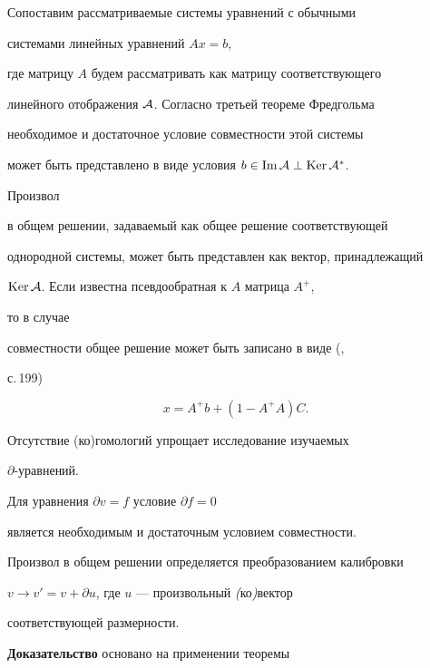  


Сопоставим рассматриваемые системы уравнений с обычными 


системами линейных уравнений $Ax=b$, 


где матрицу $A$ будем рассматривать как матрицу соответствующего 


линейного отображения $\cal A$. Согласно третьей теореме Фредгольма


необходимое и достаточное условие совместности этой системы 


может быть представлено в виде условия $b\in\Im\cal A\perp\ker\cal A^*$. 


Произвол 


в общем решении, задаваемый как общее решение соответствующей 


однородной системы, может быть представлен как вектор, принадлежащий 


$\ker\cal A$. Если известна псевдообратная к $A$ матрица $A^+$, 


то в случае 


совместности общее решение может быть записано в виде (\cite{Gla}, 


с.\,199)


\begin{equation} 


x=A^+ b+(1-A^+ A)C. 


\end{equation} 


 


Отсутствие (ко)гомологий упрощает исследование изучаемых 


$\partial$-уравнений. 


 


\begin{prop} Для уравнения $\partial v=f$ условие $\partial f=0$ 


является необходимым и достаточным условием совместности. 


Произвол в общем решении определяется преобразованием калибровки 


$v\to v'=v+\partial u$, где $u$ --- произвольный {\em (}ко{\em )}вектор 


соответствующей размерности. 


\end{prop} 


 


{\bf Доказательство} основано на применении теоремы 


